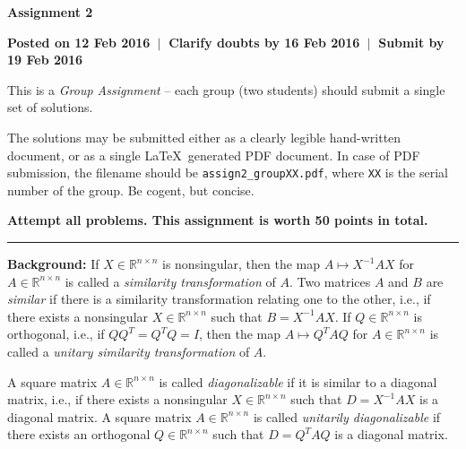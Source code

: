 \documentclass[11pt,a4paper]{article}
\begin{document}
\begin{center}
  
  \textbf{\Huge Assignment 2}

  \vspace*{10pt}  

  \textbf{Posted on 12 Feb 2016 $ \ \vert \ $ Clarify doubts by 16 Feb 2016 $ \ \vert \ $ Submit by 19 Feb 2016}

  \vspace*{10pt}  

  This is a \emph{Group Assignment} -- each group (two students) should submit a single set of solutions. 

  \vspace*{10pt}  
  
  The solutions may be submitted either as a clearly legible hand-written document, or as a single \LaTeX\ generated PDF document. In case of PDF submission, the filename should be \texttt{assign2\_groupXX.pdf}, where \texttt{XX} is the serial number of the group. Be cogent, but concise.
    
  \vspace*{10pt}  

  \textbf{Attempt all problems. This assignment is worth 50 points in total.}

  \vspace*{20pt}

  \hrule

  \vspace*{10pt}
   
\end{center}

\textbf{Background:} If $X \in \mathbb{R}^{n \times n}$ is nonsingular, then the map $A \mapsto X^{-1}AX$ for $A \in \mathbb{R}^{n \times n}$ is called a \emph{similarity transformation} of $A$. Two matrices $A$ and $B$ are \emph{similar} if there is a similarity transformation relating one to the other, i.e., if there exists a nonsingular $X \in \mathbb{R}^{n \times n}$ such that $B = X^{-1}AX$. If $Q \in \mathbb{R}^{n \times n}$ is orthogonal, i.e., if $QQ^{T} = Q^{T}Q = I$, then the map $A \mapsto Q^{T}AQ$ for $A \in \mathbb{R}^{n \times n}$ is called a \emph{unitary similarity transformation} of $A$.

A square matrix $A \in \mathbb{R}^{n \times n}$ is called \emph{diagonalizable} if it is similar to a diagonal matrix, i.e., if there exists a nonsingular $X \in \mathbb{R}^{n \times n}$ such that $D = X^{-1}AX$ is a diagonal matrix. A square matrix $A \in \mathbb{R}^{n \times n}$ is called \emph{unitarily diagonalizable} if there exists an orthogonal $Q \in \mathbb{R}^{n \times n}$ such that $D = Q^{T}AQ$ is a diagonal matrix.
\end{document}
